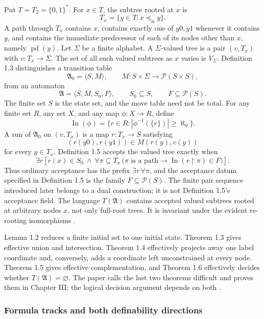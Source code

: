 Put \(T=T_2=\{0,1\}^*\).  For \(x\in T\), the subtree rooted at \(x\) is
\[
 T_x=\{y\in T:x\preccurlyeq_{\mathrm{is}}y\}.
\]
A path through \(T_x\) contains \(x\), contains exactly one of \(y0,y1\)
whenever it contains \(y\), and contains the immediate predecessor of each of
its nodes other than \(x\), namely \(\operatorname{pd}(y)\).  Let \(\Sigma\) be a finite alphabet.  A
\(\Sigma\)-valued tree is a pair \((v,T_x)\) with \(v:T_x\to\Sigma\).
The set of all such valued subtrees as \(x\) varies is \(V_\Sigma\).
Definition 1.3 distinguishes a transition table
\[
 \mathfrak A_0=\langle S,M\rangle,
 \qquad
 M:S\times\Sigma\longrightarrow\mathcal P(S\times S),
\]
from an automaton
\[
 \mathfrak A=\langle S,M,S_0,F\rangle,
 \qquad S_0\subseteq S,
 \qquad F\subseteq\mathcal P(S).
\]
The finite set \(S\) is the state set, and the move table need not be total.
For any finite set \(R\), any set \(X\), and any map \(\phi:X\to R\), define
\[
 \operatorname{In}(\phi)
   =\{r\in R:|\phi^{-1}(\{r\})|\geq\aleph_0\}.
\]
A run of \(\mathfrak A_0\) on \((v,T_x)\) is a map \(r:T_x\to S\) satisfying
\[
 (r(y0),r(y1))\in M(r(y),v(y))
\]
for every \(y\in T_x\).  Definition 1.5 accepts the valued tree exactly when
\[
 \exists r\left[
  r(x)\in S_0
  \ \land\
  \forall\pi\subseteq T_x\,
   \bigl(\pi\text{ is a path}
      \longrightarrow
      \operatorname{In}(r\mathbin{\upharpoonright}\pi)\in F\bigr)
 \right].
\]
Thus ordinary acceptance has the prefix \(\exists r\,\forall\pi\), and the
acceptance datum specified in Definition 1.5 is the family
\(F\subseteq\mathcal P(S)\).  The
finite pair sequence introduced later belongs to a dual construction; it is
not Definition 1.5's acceptance field.  The language \(T(\mathfrak A)\)
contains accepted valued subtrees rooted at arbitrary nodes \(x\), not only
full-root trees.  It is invariant under the evident re-rooting isomorphisms
\cite[pp.~5--7]{Rabin1969}.

Lemma 1.2 reduces a finite initial set to one initial state.  Theorem 1.3 gives
effective union and intersection.  Theorem 1.4 effectively projects away one
label coordinate and, conversely, adds a coordinate left unconstrained at
every node.  Theorem 1.5 gives effective complementation, and Theorem 1.6
effectively decides whether \(T(\mathfrak A)=\varnothing\).  The paper calls
the last two theorems difficult and proves them in Chapter III; the logical
decision argument depends on both
\cite[pp.~6--7]{Rabin1969}.

\subsubsection{Formula tracks and both definability directions}

